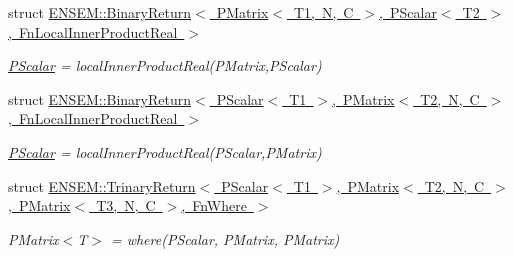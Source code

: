 \begin{DoxyCompactItemize}
struct \mbox{\hyperlink{structENSEM_1_1BinaryReturn_3_01PMatrix_3_01T1_00_01N_00_01C_01_4_00_01PScalar_3_01T2_01_4_00_01FnLocalInnerProductReal_01_4}{E\+N\+S\+E\+M\+::\+Binary\+Return$<$ P\+Matrix$<$ T1, N, C $>$, P\+Scalar$<$ T2 $>$, Fn\+Local\+Inner\+Product\+Real $>$}}
\begin{DoxyCompactList}\small\item\em \mbox{\hyperlink{classENSEM_1_1PScalar}{P\+Scalar}} = local\+Inner\+Product\+Real(\+P\+Matrix,\+P\+Scalar) \end{DoxyCompactList}\item 
struct \mbox{\hyperlink{structENSEM_1_1BinaryReturn_3_01PScalar_3_01T1_01_4_00_01PMatrix_3_01T2_00_01N_00_01C_01_4_00_01FnLocalInnerProductReal_01_4}{E\+N\+S\+E\+M\+::\+Binary\+Return$<$ P\+Scalar$<$ T1 $>$, P\+Matrix$<$ T2, N, C $>$, Fn\+Local\+Inner\+Product\+Real $>$}}
\begin{DoxyCompactList}\small\item\em \mbox{\hyperlink{classENSEM_1_1PScalar}{P\+Scalar}} = local\+Inner\+Product\+Real(\+P\+Scalar,\+P\+Matrix) \end{DoxyCompactList}\item 
struct \mbox{\hyperlink{structENSEM_1_1TrinaryReturn_3_01PScalar_3_01T1_01_4_00_01PMatrix_3_01T2_00_01N_00_01C_01_4_00_0f44c172914945b9c1c722e99398bb914}{E\+N\+S\+E\+M\+::\+Trinary\+Return$<$ P\+Scalar$<$ T1 $>$, P\+Matrix$<$ T2, N, C $>$, P\+Matrix$<$ T3, N, C $>$, Fn\+Where $>$}}
\begin{DoxyCompactList}\small\item\em P\+Matrix$<$\+T$>$ = where(\+P\+Scalar, P\+Matrix, P\+Matrix) \end{DoxyCompactList}\end{DoxyCompactItemize}
